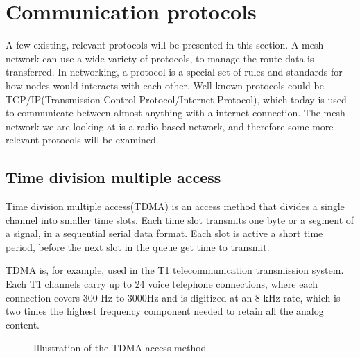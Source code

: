 \section{Communication protocols}
A few existing, relevant protocols will be presented in this section.
A mesh network can use a wide variety of protocols, to manage the route data is transferred.
In networking, a protocol is a special set of rules and standards for how nodes would interacts with each other.
Well known protocols could be TCP/IP(Transmission Control Protocol/Internet Protocol), which today is used to communicate between almost anything with a internet connection.
The mesh network we are looking at is a radio based network, and therefore some more relevant protocols will be examined. 

\subsection{Time division multiple access}
Time division multiple access(TDMA) is an access method that divides a single channel into smaller time slots.
Each time slot transmits one byte or a segment of a signal, in a sequential serial data format.
Each slot is active a short time period, before the next slot in the queue get time to transmit\cite{TDMA}.

TDMA is, for example, used in the T1 telecommunication transmission system.
Each T1 channels carry up to 24 voice telephone connections, where each connection covers 300 Hz to 3000Hz and is digitized at an 8-kHz rate, which is two times the highest frequency component needed to retain all the analog content.
\begin{figure}[!h]
	\centering
	\caption{Illustration of the TDMA access method}
	\label{fig:TDMAfigure}
\end{figure}

